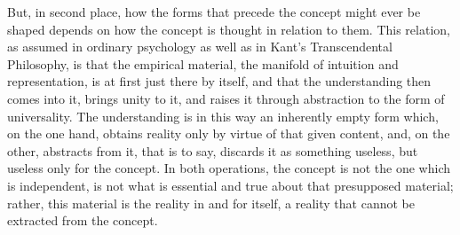 But, in second place, how the forms that
precede the concept might ever be shaped
depends on how the concept is thought in relation to them.
This relation, as assumed in ordinary psychology
as well as in Kant's Transcendental Philosophy,
is that the empirical material,
the manifold of intuition and representation,
is at first just there by itself,
and that the understanding then comes into it,
brings unity to it, and raises it
through abstraction to the form of universality.
The understanding is in this way
an inherently empty form
which, on the one hand, obtains reality
only by virtue of that given content,
and, on the other, abstracts from it,
that is to say,
discards it as something useless,
but useless only for the concept.
In both operations,
the concept is not the one which is independent,
is not what is essential and true
about that presupposed material;
rather, this material is the
reality in and for itself,
a reality that cannot be
extracted from the concept.

